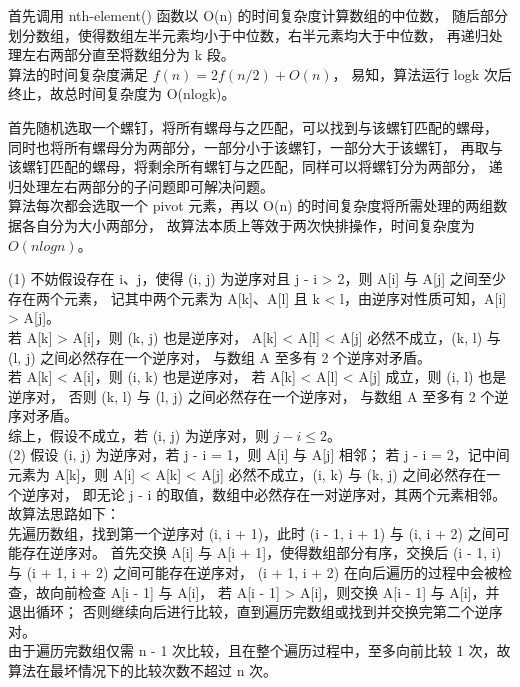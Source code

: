 \documentclass[12pt, a4paper, oneside]{ctexart}
\begin{document}
\begin{solution}[4.8]
首先调用 nth-element() 函数以 O(n) 的时间复杂度计算数组的中位数，
随后部分划分数组，使得数组左半元素均小于中位数，右半元素均大于中位数，
再递归处理左右两部分直至将数组分为 k 段。
\\算法的时间复杂度满足 $f(n) = 2f(n / 2) + O(n)$，
易知，算法运行 logk 次后终止，故总时间复杂度为 O(nlogk)。
\end{solution}

\begin{solution}[4.9]
首先随机选取一个螺钉，将所有螺母与之匹配，可以找到与该螺钉匹配的螺母，
同时也将所有螺母分为两部分，一部分小于该螺钉，一部分大于该螺钉，
再取与该螺钉匹配的螺母，将剩余所有螺钉与之匹配，同样可以将螺钉分为两部分，
递归处理左右两部分的子问题即可解决问题。
\\算法每次都会选取一个 pivot 元素，再以 O(n) 的时间复杂度将所需处理的两组数据各自分为大小两部分，
故算法本质上等效于两次快排操作，时间复杂度为 $O(nlogn)$。
\end{solution}

\begin{solution}[4.11]
(1) 不妨假设存在 i、j，使得 (i, j) 为逆序对且 j - i > 2，则 A[i] 与 A[j] 之间至少存在两个元素，
记其中两个元素为 A[k]、A[l] 且 k < l，由逆序对性质可知，A[i] > A[j]。
\\若 A[k] > A[i]，则 (k, j) 也是逆序对，
A[k] < A[l] < A[j] 必然不成立，(k, l) 与 (l, j) 之间必然存在一个逆序对，
与数组 A 至多有 2 个逆序对矛盾。
\\若 A[k] < A[i]，则 (i, k) 也是逆序对，
若 A[k] < A[l] < A[j] 成立，则 (i, l) 也是逆序对，
否则 (k, l) 与 (l, j) 之间必然存在一个逆序对，
与数组 A 至多有 2 个逆序对矛盾。
\\综上，假设不成立，若 (i, j) 为逆序对，则 $j - i \leq 2$。
\\(2) 假设 (i, j) 为逆序对，若 j - i = 1，则 A[i] 与 A[j] 相邻；
若 j - i = 2，记中间元素为 A[k]，则 A[i] < A[k] < A[j] 必然不成立，(i, k) 与 (k, j) 之间必然存在一个逆序对，
即无论 j - i 的取值，数组中必然存在一对逆序对，其两个元素相邻。故算法思路如下：
\\先遍历数组，找到第一个逆序对 (i, i + 1)，此时 (i - 1, i + 1) 与 (i, i + 2) 之间可能存在逆序对。
首先交换 A[i] 与 A[i + 1]，使得数组部分有序，交换后 (i - 1, i) 与 (i + 1, i + 2) 之间可能存在逆序对，
(i + 1, i + 2) 在向后遍历的过程中会被检查，故向前检查 A[i - 1] 与 A[i]，
若 A[i - 1] > A[i]，则交换 A[i - 1] 与 A[i]，并退出循环；
否则继续向后进行比较，直到遍历完数组或找到并交换完第二个逆序对。
\\由于遍历完数组仅需 n - 1 次比较，且在整个遍历过程中，至多向前比较 1 次，故算法在最坏情况下的比较次数不超过 n 次。
\end{solution}
\end{document}
